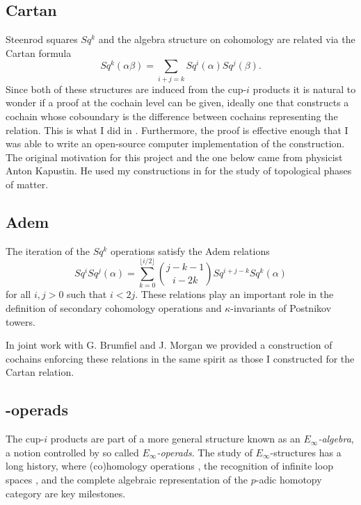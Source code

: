 \subsection{Cartan} \label{ss:cartan}

Steenrod squares $Sq^k$ and the algebra structure on cohomology are related via the Cartan formula
\begin{equation*}
Sq^k(\alpha \beta) = \sum_{i+j=k} Sq^i(\alpha) Sq^j(\beta).
\end{equation*}
Since both of these structures are induced from the cup-$i$ products it is natural to wonder if a proof at the cochain level can be given, ideally one that constructs a cochain whose coboundary is the difference between cochains representing the relation.
This is what I did in \cite{medina2020cartan}.
Furthermore, the proof is effective enough that I was able to write an open-source computer implementation of the construction.
The original motivation for this project and the one below came from physicist Anton Kapustin.
He used my constructions in \cite{kapustin2017fermionic} for the study of topological phases of matter.

\subsection{Adem} \label{ss:adem}

The iteration of the $Sq^k$ operations satisfy the Adem relations
\begin{equation*}
Sq^i Sq^j(\alpha) = \sum_{k=0}^{\lfloor i/2 \rfloor} \binom{j-k-1}{i-2k} Sq^{i+j-k} Sq^k(\alpha)
\end{equation*}
for all $i,j > 0$ such that $i < 2j$.
These relations play an important role in the definition of secondary cohomology operations and $\kappa$-invariants of Postnikov towers.

In joint work with G. Brumfiel and J. Morgan \cite{medina2021adem} we provided a construction of cochains enforcing these relations in the same spirit as those I constructed for the Cartan relation.

\subsection{\pdfEinfty-operads}

The cup-$i$ products are part of a more general structure known as an \textit{$E_\infty$-algebra}, a notion controlled by so called \textit{$E_\infty$-operads}.
The study of $E_\infty$-structures has a long history, where (co)homology operations \cite{steenrod1962cohomology, may1970general}, the recognition of infinite loop spaces \cite{boardman1973homotopy, may1972geometry}, and the complete algebraic representation of the $p$-adic homotopy category \cite{mandell2001padic} are key milestones.

